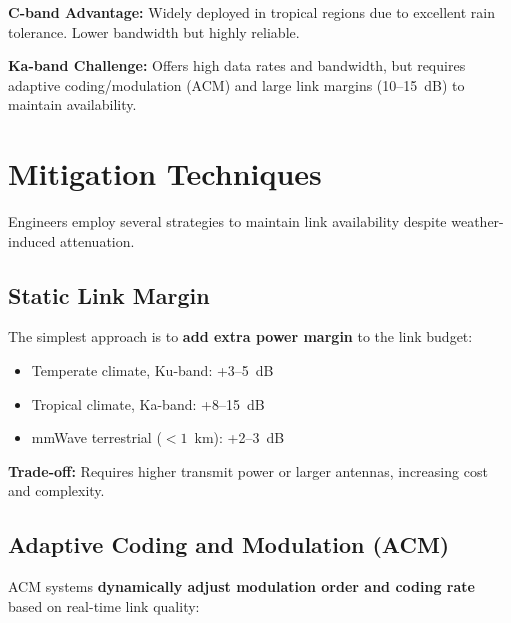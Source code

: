 \textbf{C-band Advantage:} Widely deployed in tropical regions due to excellent rain tolerance. Lower bandwidth but highly reliable.

\textbf{Ka-band Challenge:} Offers high data rates and bandwidth, but requires adaptive coding/modulation (ACM) and large link margins (10--15~dB) to maintain availability.

\section{Mitigation Techniques}

Engineers employ several strategies to maintain link availability despite weather-induced attenuation.

\subsection{Static Link Margin}

The simplest approach is to \textbf{add extra power margin} to the link budget:

\begin{itemize}
\item Temperate climate, Ku-band: +3--5~dB
\item Tropical climate, Ka-band: +8--15~dB
\item mmWave terrestrial ($< 1$~km): +2--3~dB
\end{itemize}

\textbf{Trade-off:} Requires higher transmit power or larger antennas, increasing cost and complexity.

\subsection{Adaptive Coding and Modulation (ACM)}

ACM systems \textbf{dynamically adjust modulation order and coding rate} based on real-time link quality:

